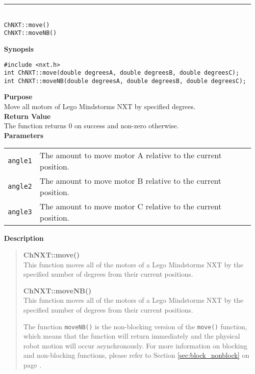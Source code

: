 \noindent
\vspace{5pt}
\rule{4.5in}{0.015in}\\
\noindent
{\LARGE \texttt{ChNXT::move()} }\\
{\LARGE \texttt{ChNXT::moveNB()} }\\


\noindent
{\bf Synopsis}
\begin{lstlisting}
#include <nxt.h>
int ChNXT::move(double degreesA, double degreesB, double degreesC);
int ChNXT::moveNB(double degreesA, double degreesB, double degreesC);
\end{lstlisting}

\noindent
{\bf Purpose}\\
Move all motors of Lego Mindstorms NXT by specified degrees.\\

\noindent
{\bf Return Value}\\
The function returns 0 on success and non-zero otherwise.\\

\noindent
{\bf Parameters}\\
\vspace{-0.1in}
\begin{description}
\item               
\begin{tabular}{p{15 mm}p{125 mm}}
\texttt{angle1} & The amount to move motor A relative to the current position. \\
\texttt{angle2} & The amount to move motor B relative to the current position. \\
\texttt{angle3} & The amount to move motor C relative to the current position. \\
\end{tabular}
\end{description}

\noindent
{\bf Description}\\
\vspace{-12pt}
\begin{quote}
{\bf ChNXT::move()}\\
This function moves all of the motors of a Lego Mindstorms NXT by 
the specified number of degrees from their current positions. 

\noindent
{\bf ChNXT::moveNB()}\\
This function moves all of the motors of a Lego Mindstorms NXT by 
the specified number of degrees from their current positions. 

The function \texttt{moveNB()} is the non-blocking version of the 
\texttt{move()} function, which means that the function will 
return immediately and the physical robot motion will occur 
asynchronously. For more information on blocking and non-blocking 
functions, please refer to Section \ref{sec:block_nonblock} on page 
\pageref{sec:block_nonblock}.\\
\end{quote}

